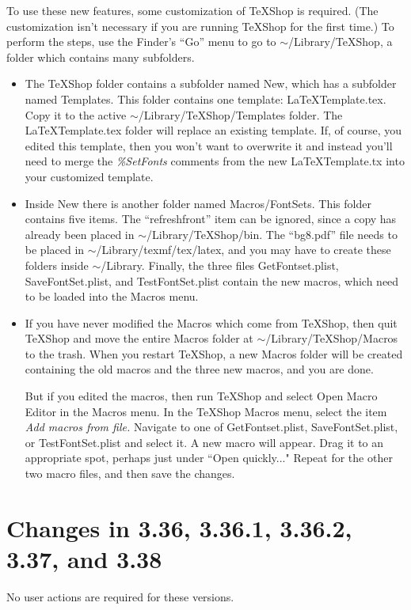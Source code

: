 \documentclass[11pt, oneside]{amsart}
\begin{document}
To use these new features, some customization of TeXShop is required. (The customization isn't
necessary if you are running TeXShop for the first time.) To perform the steps, use the
Finder's ``Go'' menu to go to $\sim$/Library/TeXShop, a folder which contains many subfolders.
\begin{itemize}
\item The TeXShop folder contains a subfolder named New, which has a subfolder named Templates. This folder contains one template: LaTeXTemplate.tex. Copy it to the
active $\sim$/Library/TeXShop/Templates folder. The LaTeXTemplate.tex folder will replace an existing template. If, of course, you edited this template, then you won't want to overwrite it and instead you'll need to merge the {\em \%SetFonts} comments from the new LaTeXTemplate.tx into your customized template.
\item Inside New there is another folder named Macros/FontSets. This folder contains five items. 
The ``refreshfront'' item can be ignored, since a copy has already been placed in $\sim$/Library/TeXShop/bin. The ``bg8.pdf'' file needs to be placed in $\sim$/Library/texmf/tex/latex, and you may have to create these folders inside $\sim$/Library. Finally, the three files GetFontset.plist, SaveFontSet.plist, and TestFontSet.plist contain the new macros, which need to be loaded into
the Macros menu.
\item If you have never modified the Macros which come from TeXShop, then quit TeXShop and
move the entire Macros folder at $\sim$/Library/TeXShop/Macros to the trash. When you restart TeXShop, a  new Macros folder
will be created containing the old macros and the three new macros, and you are done.

But if you  edited the macros, then run TeXShop and select Open Macro Editor in the Macros menu. In the TeXShop  Macros menu,   select the item {\em Add macros from file.} Navigate to 
one of GetFontset.plist, SaveFontSet.plist, or TestFontSet.plist and select it.  A new macro will appear. Drag it to an appropriate spot, perhaps just under ``Open quickly..." Repeat for the other two macro files, and then save the changes.
\end{itemize}



\section{Changes in 3.36, 3.36.1,  3.36.2, 3.37, and 3.38}

No user actions are required for these versions.
\end{document}
